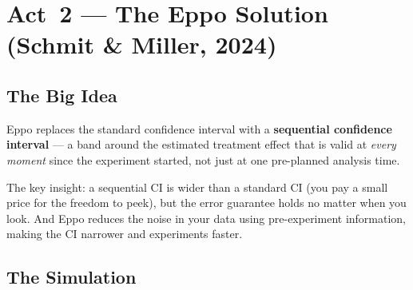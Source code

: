 \documentclass[12pt, a4paper]{article}
\begin{document}
\newpage
\section{Act~2 --- The Eppo Solution\\
         (Schmit \& Miller, 2024)}

\subsection{The Big Idea}

\begin{intuition}
Eppo replaces the standard confidence interval with a \textbf{sequential
confidence interval} --- a band around the estimated treatment effect that
is valid at \emph{every moment} since the experiment started, not just at
one pre-planned analysis time.

The key insight: a sequential CI is wider than a standard CI (you pay a
small price for the freedom to peek), but the error guarantee holds no
matter when you look.  And Eppo reduces the noise in your data using
pre-experiment information, making the CI narrower and experiments faster.
\end{intuition}

\subsection{The Simulation}
\end{document}
